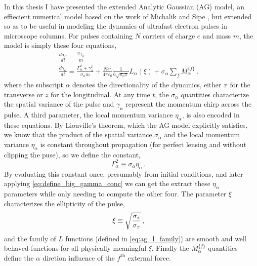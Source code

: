 In this thesis I have presented the extended Analytic Gaussian (AG) model, an effiecient numerical model based on the work of Michalik and Sipe \cite{michalik_analytic_2006}, but extended so as to be useful in modeling the dynamics of ultrafast electron pulses in microscope columns.
For pulses containing $N$ carriers of charge $e$ and mass $m$, the model is simply these four equations,
\begin{subequations}
\begin{gather}
  \frac{d\sigma_{\alpha}}{dt} = \frac{2\gamma_{\alpha}}{m} \\
  \frac{d\gamma_{\alpha}}{dt} = \frac{ \Gamma_{\alpha}^2 + \gamma_{\alpha}^2 }{\sigma_{\alpha} m}
    + \frac{N e^2}{4\pi\varepsilon_0} \frac{1}{6 \sqrt{\sigma_{\alpha}\pi}} L_{\alpha}(\xi) + \sigma_{\alpha} \sum\limits_{f} M_{\alpha}^{\lbrace f \rbrace} \label{eq:ag_model_gamma_conc} \,\text{.}
\end{gather}
\end{subequations}
where the subscript $\alpha$ denotes the directionality of the dynamics, either ${\scriptscriptstyle T}$ for the transverse or $z$ for the longitudinal.
At any time $t$, the $\sigma_{\alpha}$ quantities characterize the spatial variance of the pulse and $\gamma_{\alpha}$ represent the momentum chirp across the pulse.
A third parameter, the local momentum variance $\eta_{\alpha}$, is also encoded in these equations.
By Liouville's theorem, which the AG model explicitly satisfies, we know that the product of the spatial variance $\sigma_{\alpha}$ and the local momentum variance $\eta_{\alpha}$ is constant throughout propagation (for perfect lensing and without clipping the puse), so we define the constant,
\begin{equation} \label{eq:define_big_gamma_conc}
  \Gamma_{\alpha}^2 \equiv \sigma_{\alpha} \eta_{\alpha} \,\text{.}
\end{equation}
By evaluating this constant once, presumably from initial conditions, and later applying \ref{eq:define_big_gamma_conc} we can get the extract these $\eta_{\alpha}$ parameters while only needing to compute the other four.
The parameter $\xi$ characterizes the ellipticity of the pulse,
\begin{equation}
  \xi \equiv \sqrt{\dfrac{\sigma_{z}}{\sigma_{{\scriptscriptstyle T}}}} \,\text{,}
\end{equation}
and the family of $L$ functions (defined in \ref{eq:ag_l_family}) are smooth and well behaved functions for all physically meaningful $\xi$.
Finally the $M_{\alpha}^{\lbrace f \rbrace}$ quantities define the $\alpha$ diretion influence of the $f^{\text{th}}$ external force.


